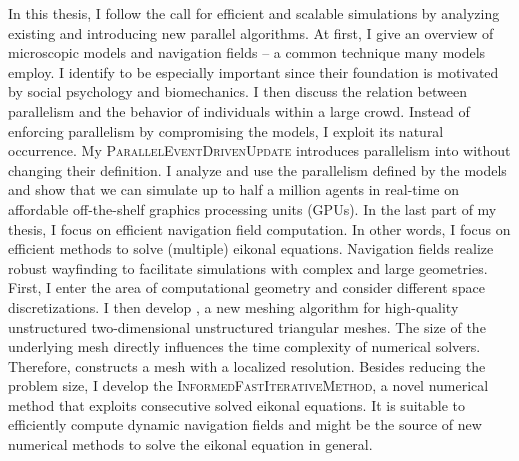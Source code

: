 {In this thesis, I follow the call for efficient and scalable simulations by analyzing existing and introducing new parallel algorithms.
At first, I give an overview of microscopic models and navigation fields -- a common technique many models employ.
I identify \OSMs{} to be especially important since their foundation is motivated by social psychology and biomechanics.
I then discuss the relation between parallelism and the behavior of individuals within a large crowd.
Instead of enforcing parallelism by compromising the models, I exploit its natural occurrence.
My \textsc{ParallelEventDrivenUpdate} introduces parallelism into \OSMs{} without changing their definition.
I analyze and use the parallelism defined by the models and show that we can simulate up to half a million agents in real-time on affordable off-the-shelf graphics processing units (GPUs).
In the last part of my thesis, I focus on efficient navigation field computation.
In other words, I focus on efficient methods to solve (multiple) eikonal equations.
Navigation fields realize robust wayfinding to facilitate simulations with complex and large geometries.
First, I enter the area of computational geometry and consider different space discretizations.
I then develop \eikmesh{}, a new meshing algorithm for high-quality unstructured two-dimensional unstructured triangular meshes.
The size of the underlying mesh directly influences the time complexity of numerical solvers.
Therefore, \eikmesh{} constructs a mesh with a localized resolution.
Besides reducing the problem size, I develop the \textsc{InformedFastIterativeMethod}, a novel numerical method that exploits consecutive solved eikonal equations.
It is suitable to efficiently compute dynamic navigation fields and might be the source of new numerical methods to solve the eikonal equation in general.
%
}

